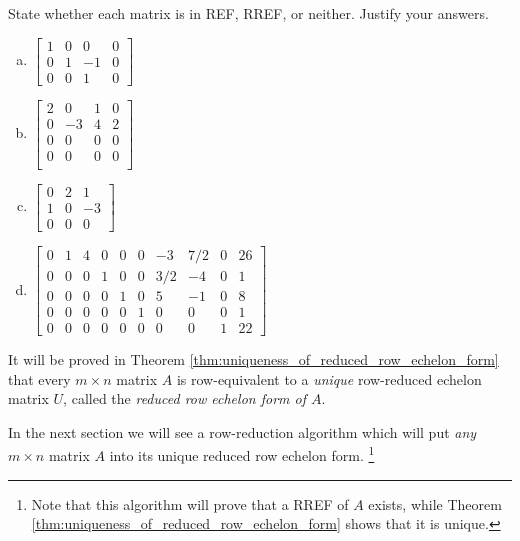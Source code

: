 \documentclass[12pt,letterpaper,reqno]{article}
\numberwithin{equation}{section}
\newcommand{\fixme}[1]{{\color{orange}{[#1]}}}
\begin{document}
\begin{exercise}
	State whether each matrix is in REF, RREF, or neither. Justify your answers.
	\begin{enumerate}[(a)]
	\item $\begin{bmatrix}
		1&0&0&0 \\
		0&1&-1&0 \\
		0&0&1&0
	\end{bmatrix}$
	\item $\begin{bmatrix}
		2 &0&1&0 \\
		0&-3&4&2 \\
		0&0&0&0 \\
		0&0&0&0 \\
	\end{bmatrix}$
	\item $\begin{bmatrix}
		0&2&1 \\
		1&0&-3 \\
		0&0&0 
	\end{bmatrix}$
	\item $\begin{bmatrix}
		0&1&4&0&0&0&-3&7/2 & 0 & 26 \\
		0&0&0&1&0&0&3/2&-4 & 0 & 1 \\
		0&0&0&0&1&0&5&-1&0&8 \\
		0&0&0&0&0&1&0&0&0&1 \\
		0&0&0&0&0&0&0&0 & 1 & 22
	\end{bmatrix}$
\end{enumerate}
\end{exercise}

It will be proved in Theorem \ref{thm:uniqueness_of_reduced_row_echelon_form} that every $m \times n$ matrix $A$ is row-equivalent to a \emph{unique} row-reduced echelon matrix $U$, called the \emph{reduced row echelon form of $A$}.

In the next section we will see a row-reduction algorithm which will put \emph{any} $m \times n$ matrix $A$ into its unique reduced row echelon form. \footnote{Note that this algorithm will prove that a RREF of $A$ exists, while Theorem \ref{thm:uniqueness_of_reduced_row_echelon_form} shows that it is unique.}

 \fixme{Explain here why RREF is what we want to arrive at by performing elementary row operations. Columns with no leading 1s are called free variables. These will be parameters, and the leading 1s allow us to solve for the remaining variables in terms of the free ones, giving us the parametric description of the solution set.}
\end{document}
